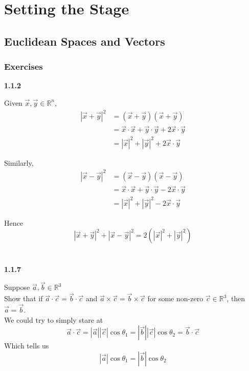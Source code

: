 \section{Setting the Stage}

\subsection{Euclidean Spaces and Vectors}

\subsubsection{Exercises}

\textbf{1.1.2}

Given $\vec{x}, \vec{y} \in \mathbb{R}^n$,
\begin{align*}
|\vec{x} + \vec{y} |^2 &= (\vec{x} +\vec{y}) (\vec{x} +\vec{y}) \\
&= \vec{x}\cdot\vec{x} + \vec{y}\cdot\vec{y} + 2\vec{x}\cdot\vec{y} \\
&= |\vec{x}|^2 + |\vec{y}|^2 + 2\vec{x}\cdot\vec{y}
\end{align*}

Similarly,
\begin{align*}
|\vec{x} - \vec{y} |^2 &= (\vec{x} - \vec{y}) (\vec{x} - \vec{y}) \\
    &= \vec{x}\cdot\vec{x} + \vec{y}\cdot\vec{y} - 2\vec{x}\cdot\vec{y} \\
    &= |\vec{x}|^2 + |\vec{y}|^2 - 2\vec{x}\cdot\vec{y}
\end{align*}

Hence
$$
|\vec{x} + \vec{y} |^2 + |\vec{x} - \vec{y} |^2 = 2\left( |\vec{x}|^2 + |\vec{y}|^2 \right)
$$
\\~\\



\textbf{1.1.7}

Suppose $\vec{a}, \vec{b} \in \mathbb{R}^3$
\\

Show that if $\vec{a}\cdot\vec{c} = \vec{b}\cdot\vec{c}$ and
$\vec{a}\times\vec{c} = \vec{b}\times\vec{c}$ for some non-zero $\vec{c} \in\mathbb{R}^3$,
then $\vec{a} = \vec{b}$.
\\

We could try to simply stare at
$$
\vec{a}\cdot\vec{c} = |\vec{a}| |\vec{c}| \cos{\theta_1} 
= |\vec{b}| |\vec{c}| \cos{\theta_2} = \vec{b}\cdot\vec{c}
$$
Which tells us
$$
|\vec{a}| \cos{\theta_1} = |\vec{b}| \cos{\theta_2}
$$

